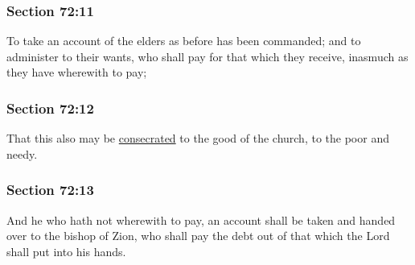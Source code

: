 	\subsubsection{Section 72:11} %
		\label{DC72-11}

		To take an account of the elders as before has been commanded; and to administer to their wants, who shall pay for that which they receive, inasmuch as they have wherewith to pay;


	\subsubsection{Section 72:12} %
		\label{DC72-12}

		That this also may be \hyperref[CONSECRATION]{consecrated} to the good of the church, to the poor and needy.


	\subsubsection{Section 72:13} %
		\label{DC72-13}

		And he who hath not wherewith to pay, an account shall be taken and handed over to the bishop of Zion, who shall pay the debt out of that which the Lord shall put into his hands.


